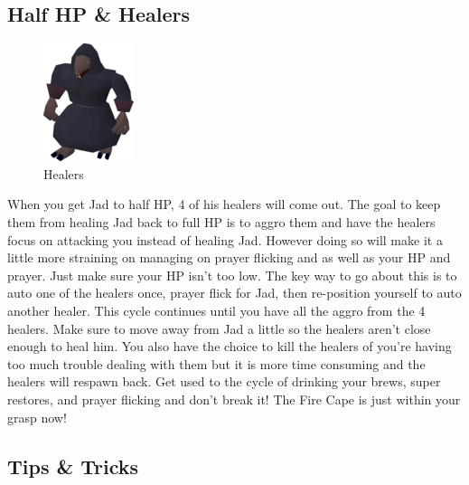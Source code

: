 \documentclass{article}
\begin{document}
\subsection{Half HP \& Healers}
\begin{figure}
\includegraphics[width=.2\textwidth]{yt2.png}
\small \caption*{Healers}
\end{figure}
When you get Jad to half HP, 4 of his healers will come out. The goal to keep them from healing Jad back to full HP is to aggro them and have the healers focus on attacking you instead of healing Jad. However doing so will make it a little more straining on managing on prayer flicking and as well as your HP and prayer. Just make sure your HP isn't too low. The key  way to go about this is to auto one of the healers once, prayer flick for Jad, then re-position yourself to auto another healer. This cycle continues until you have all the aggro from the 4 healers. Make sure to move away from Jad a little so the healers aren't close enough to heal him. You also have the choice to kill the healers of you're having too much trouble dealing with them but it is more time consuming and the healers will respawn back. Get used to the cycle of drinking your brews, super restores, and prayer flicking and don't break it! The Fire Cape is just within your grasp now!
\subsection{Tips \& Tricks}
\end{document}
